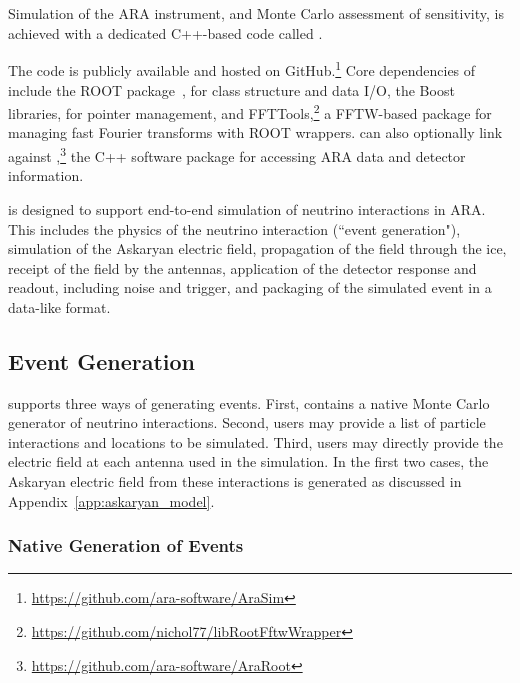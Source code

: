 \chapter{\arasim{} \label{app:AraSim}}

    Simulation of the ARA instrument, and Monte Carlo assessment of sensitivity, is achieved with a dedicated C++-based code called \arasim{}.

    The code is publicly available and hosted on GitHub.\footnote{\url{https://github.com/ara-software/AraSim}}
    Core dependencies of \arasim{} include the ROOT package~\citep{root}, 
    for class structure and data I/O,
    the Boost libraries, for pointer management, and FFTTools,\footnote{\url{https://github.com/nichol77/libRootFftwWrapper}}
    a FFTW-based package for managing fast Fourier transforms with ROOT wrappers.
    \arasim{} can also optionally link against \araroot{},\footnote{\url{https://github.com/ara-software/AraRoot}} the C++ software package for accessing ARA data and detector information.

    \arasim{} is designed to support end-to-end simulation of neutrino interactions in ARA.
    This includes the physics of the neutrino interaction (``event generation"),
    simulation of the Askaryan electric field, propagation of the field through the ice,
    receipt of the field by the antennas,
    application of the detector response and readout, including noise and trigger,
    and packaging of the simulated event in a data-like format.
        
    \section{Event Generation}
        
        \arasim{} supports three ways of generating events.
        First, \arasim{} contains a native Monte Carlo generator 
        of neutrino interactions.
        Second, users may provide a list of particle interactions and locations to be simulated.
        Third, users may directly provide the electric field at each antenna used in the simulation.
        In the first two cases, the Askaryan electric field from these interactions is generated as discussed in Appendix~\ref{app:askaryan_model}.
        
        \subsection{Native Generation of Events}

